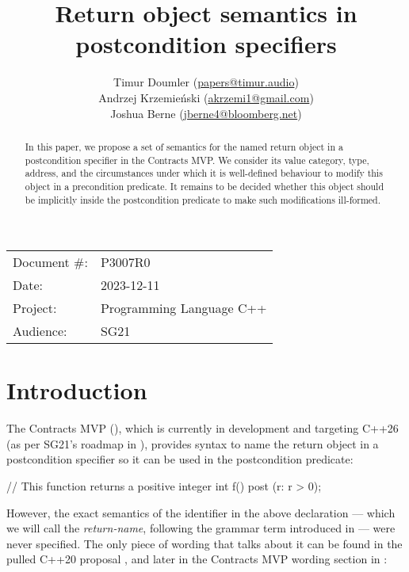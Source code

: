 

 \usepackage[bottom]{footmisc} 


\title{Return object semantics in postcondition specifiers}
\author{ Timur Doumler \small(\href{mailto:papers@timur.audio}{papers@timur.audio}) \\
Andrzej Krzemie\' nski \small(\href{mailto:akrzemi1@gmail.com}{akrzemi1@gmail.com}) \\
Joshua Berne \small(\href{jberne4@bloomberg.net}{jberne4@bloomberg.net})
}
\date{}
\maketitle

\begin{tabular}{ll}
Document \#: & P3007R0 \\
Date: &2023-12-11 \\
Project: & Programming Language C++ \\
Audience: & SG21
\end{tabular}

\begin{abstract}
In this paper, we propose a set of semantics for the named return object in a postcondition specifier in the Contracts MVP. We consider its value category, type, address, and the circumstances under which it is well-defined behaviour to modify this object in a precondition predicate. It remains to be decided whether this object should be implicitly  inside the postcondition predicate to make such modifications ill-formed.
\end{abstract}

\section{Introduction}
\label{sec:intro}

The Contracts MVP (\cite{P2900R2}), which is currently in development and targeting C++26 (as per SG21's roadmap in \cite{P2695R1}), provides syntax to name the return object in a postcondition specifier so it can be used in the postcondition predicate:
\begin{codeblock}
// This function returns a positive integer
int f()
  post (r: r > 0);
\end{codeblock}
However, the exact semantics of the identifier  in the above declaration --- which we will call the \emph{return-name}, following the grammar term introduced in \cite{P2932R2} --- were never specified. The only piece of wording that talks about it can be found in the pulled C++20 proposal \cite{P0542R5}, and later in the Contracts MVP wording section in \cite{P2388R4}:

